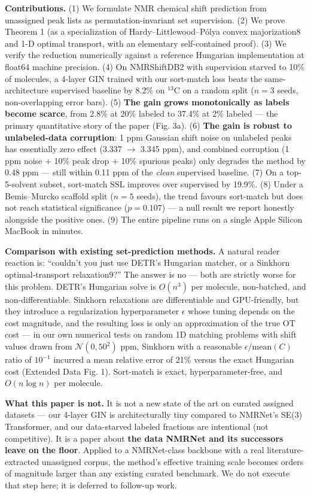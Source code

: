 \documentclass[
]{article}
\begin{document}
\textbf{Contributions.} (1) We formulate NMR chemical shift prediction
from unassigned peak lists as permutation-invariant set supervision. (2)
We prove Theorem 1 (as a specialization of Hardy--Littlewood--Pólya
convex majorization8 and 1-D optimal transport, with an elementary
self-contained proof). (3) We verify the reduction numerically against a
reference Hungarian implementation at float64 machine precision. (4) On
NMRShiftDB2 with supervision starved to 10\% of molecules, a 4-layer GIN
trained with our sort-match loss beats the same-architecture supervised
baseline by 8.2\% on \(^{13}\)C on a random split (\(n=3\) seeds,
non-overlapping error bars). (5) \textbf{The gain grows monotonically as
labels become scarce}, from 2.8\% at 20\% labeled to 37.4\% at 2\%
labeled --- the primary quantitative story of the paper (Fig. 3a). (6)
\textbf{The gain is robust to unlabeled-data corruption}: 1 ppm Gaussian
shift noise on unlabeled peaks has essentially zero effect (3.337
\(\rightarrow\) 3.345 ppm), and combined corruption (1 ppm noise + 10\%
peak drop + 10\% spurious peaks) only degrades the method by 0.48 ppm
--- still within 0.11 ppm of the \emph{clean} supervised baseline. (7)
On a top-5-solvent subset, sort-match SSL improves over supervised by
19.9\%. (8) Under a Bemis--Murcko scaffold split (\(n=5\) seeds), the
trend favours sort-match but does not reach statistical significance
(\(p=0.107\)) --- a null result we report honestly alongside the
positive ones. (9) The entire pipeline runs on a single Apple Silicon
MacBook in minutes.

\textbf{Comparison with existing set-prediction methods.} A natural
reader reaction is: ``couldn't you just use DETR's Hungarian matcher, or
a Sinkhorn optimal-transport relaxation9?'' The answer is no --- both
are strictly worse for this problem. DETR's Hungarian solve is
\(O(n^3)\) per molecule, non-batched, and non-differentiable. Sinkhorn
relaxations are differentiable and GPU-friendly, but they introduce a
regularization hyperparameter \(\epsilon\) whose tuning depends on the
cost magnitude, and the resulting loss is only an approximation of the
true OT cost --- in our own numerical tests on random 1D matching
problems with shift values drawn from \(\mathcal{N}(0, 50^2)\) ppm,
Sinkhorn with a reasonable \(\epsilon/\mathrm{mean}(C)\) ratio of
\(10^{-1}\) incurred a mean relative error of 21\% versus the exact
Hungarian cost (Extended Data Fig. 1). Sort-match is exact,
hyperparameter-free, and \(O(n\log n)\) per molecule.

\textbf{What this paper is not.} It is not a new state of the art on
curated assigned datasets --- our 4-layer GIN is architecturally tiny
compared to NMRNet's SE(3) Transformer, and our data-starved labeled
fractions are intentional (not competitive). It is a paper about
\textbf{the data NMRNet and its successors leave on the floor}. Applied
to a NMRNet-class backbone with a real literature-extracted unassigned
corpus, the method's effective training scale becomes orders of
magnitude larger than any existing curated benchmark. We do not execute
that step here; it is deferred to follow-up work.
\end{document}
